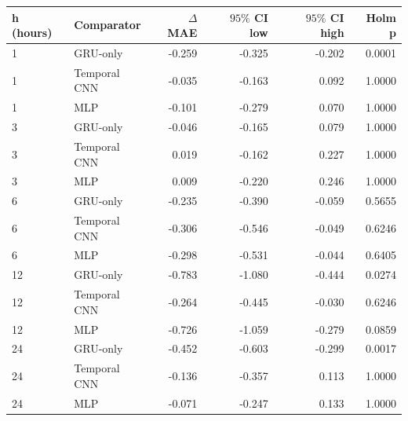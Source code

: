 \begin{tabular}{llrrrr}\hline
h (hours) & Comparator & $\Delta$MAE & $95\%$ CI low & $95\%$ CI high & Holm p \\
\hline
1 & GRU-only & -0.259 & -0.325 & -0.202 & 0.0001 \\
1 & Temporal CNN & -0.035 & -0.163 & 0.092 & 1.0000 \\
1 & MLP & -0.101 & -0.279 & 0.070 & 1.0000 \\
3 & GRU-only & -0.046 & -0.165 & 0.079 & 1.0000 \\
3 & Temporal CNN & 0.019 & -0.162 & 0.227 & 1.0000 \\
3 & MLP & 0.009 & -0.220 & 0.246 & 1.0000 \\
6 & GRU-only & -0.235 & -0.390 & -0.059 & 0.5655 \\
6 & Temporal CNN & -0.306 & -0.546 & -0.049 & 0.6246 \\
6 & MLP & -0.298 & -0.531 & -0.044 & 0.6405 \\
12 & GRU-only & -0.783 & -1.080 & -0.444 & 0.0274 \\
12 & Temporal CNN & -0.264 & -0.445 & -0.030 & 0.6246 \\
12 & MLP & -0.726 & -1.059 & -0.279 & 0.0859 \\
24 & GRU-only & -0.452 & -0.603 & -0.299 & 0.0017 \\
24 & Temporal CNN & -0.136 & -0.357 & 0.113 & 1.0000 \\
24 & MLP & -0.071 & -0.247 & 0.133 & 1.0000 \\
\hline
\end{tabular}
